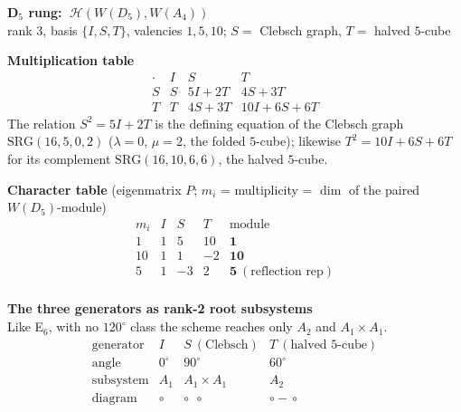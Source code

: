 \documentclass[10pt]{article}
\begin{document}
\vspace{6pt}
\begin{center}\end{center}

\clearpage

\begin{center}{\Large\bfseries D$_5$ rung: $\ \mathcal H(W(D_5),W(A_4))$}\\[2pt]
{\small rank 3, basis $\{I,S,T\}$, valencies $1,5,10$;
$S=$ Clebsch graph, $T=$ halved $5$-cube}\end{center}
\vspace{10pt}

{\bfseries Multiplication table} 
\[
\renewcommand{\arraystretch}{1.4}
\begin{array}{c|ccc}
\cdot & I & S & T\\\hline
S & S & 5I{+}2T & 4S{+}3T\\
T & T & 4S{+}3T & 10I{+}6S{+}6T
\end{array}
\]
The relation $S^2=5I+2T$ is the defining equation of the Clebsch graph
$\mathrm{SRG}(16,5,0,2)$ ($\lambda=0$, $\mu=2$, the folded $5$-cube); likewise
$T^2=10I+6S+6T$ for its complement $\mathrm{SRG}(16,10,6,6)$, the halved
$5$-cube.
\vspace{6pt}

{\bfseries Character table} (eigenmatrix $P$; $m_i$ = multiplicity = $\dim$ of
the paired $W(D_5)$-module)
\[
\renewcommand{\arraystretch}{1.25}
\begin{array}{c|ccc|l}
m_i & I & S & T & \text{module}\\\hline
1 & 1 & 5 & 10 & \mathbf 1\\
10 & 1 & 1 & -2 & \mathbf{10}\\
5 & 1 & -3 & 2 & \mathbf 5\ (\text{reflection rep})\\
\end{array}
\]
\vspace{2pt}

{\bfseries The three generators as rank-2 root subsystems}\\[2pt]
{\small Like E$_6$, with no $120^\circ$ class the scheme reaches only $A_2$ and
$A_1{\times}A_1$.}
\[
\renewcommand{\arraystretch}{1.35}
\begin{array}{r|ccc}
\text{generator} & I & S\ (\text{Clebsch}) & T\ (\text{halved 5-cube})\\\hline
\text{angle} & 0^\circ & 90^\circ & 60^\circ\\
\text{subsystem} & A_1 & A_1{\times}A_1 & A_2\\
\text{diagram} & \circ & \circ\ \ \circ & \circ\!\!-\!\!\circ
\end{array}
\]
\vspace{2pt}
\end{document}
